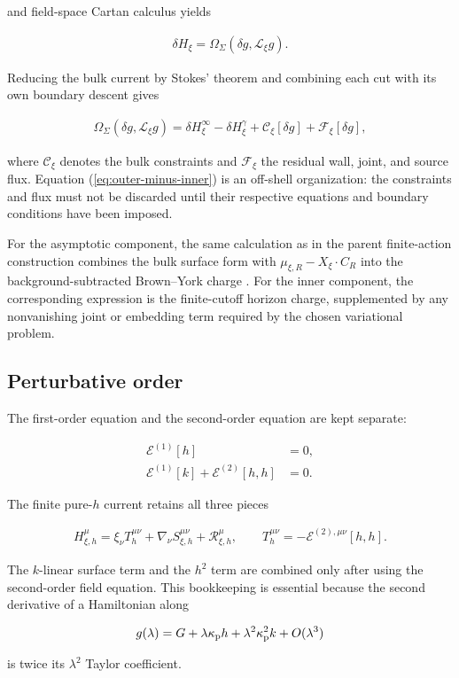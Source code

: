 and field-space Cartan calculus yields

\begin{align}
\delta H_\xi
=\Omega_\Sigma(\delta g,\mathcal L_\xi g). \label{eq:hamiltonian-identity}
\end{align}

Reducing the bulk current by Stokes' theorem and combining each cut with its own boundary descent gives

\begin{align}
\Omega_\Sigma(\delta g,\mathcal L_\xi g)
=\delta H_\xi^\infty-\delta H_\xi^\gamma
+\mathcal C_\xi[\delta g]
+\mathcal F_\xi[\delta g], \label{eq:outer-minus-inner}
\end{align}

where $\mathcal C_\xi$ denotes the bulk constraints and $\mathcal F_\xi$ the residual wall, joint, and source flux. Equation (\ref{eq:outer-minus-inner}) is an off-shell organization: the constraints and flux must not be discarded until their respective equations and boundary conditions have been imposed.

For the asymptotic component, the same calculation as in the parent finite-action construction combines the bulk surface form with $\mu_{\xi,R}-X_\xi\cdot C_R$ into the background-subtracted Brown--York charge \cite{Brown:1992br,Gao:2026graviton}. For the inner component, the corresponding expression is the finite-cutoff horizon charge, supplemented by any nonvanishing joint or embedding term required by the chosen variational problem.

\subsection{Perturbative order}\label{subsec:perturbative-order}

The first-order equation and the second-order equation are kept separate:

\begin{align}
\mathcal E^{(1)}[h]&=0,\\
\mathcal E^{(1)}[k]+\mathcal E^{(2)}[h,h]&=0.
\end{align}

The finite pure-$h$ current retains all three pieces

\begin{align}
H_{\xi,h}^{\mu}
=\xi_\nu T_h^{\mu\nu}
+\nabla_\nu S_{\xi,h}^{\mu\nu}
+\mathcal R_{\xi,h}^{\mu},
\qquad
T_h^{\mu\nu}=-\mathcal E^{(2),\mu\nu}[h,h].
\end{align}

The $k$-linear surface term and the $h^2$ term are combined only after using the second-order field equation. This bookkeeping is essential because the second derivative of a Hamiltonian along

\begin{align}
g(\lambda)=G+\lambda\kappa_{\rm p}h
+\lambda^2\kappa_{\rm p}^{2}k+O(\lambda^3)
\end{align}

is twice its $\lambda^2$ Taylor coefficient.
